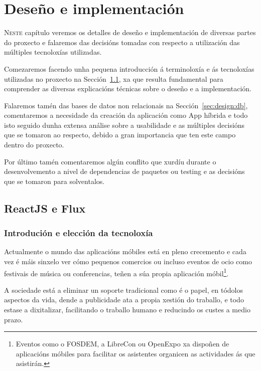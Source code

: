 \chapter{Deseño e implementación}
\minitoc


  \lettrine{N}{este} capítulo veremos os detalles de deseño e implementación 
de diversas partes do proxecto e falaremos das decisións tomadas con 
respecto a utilización das múltiples tecnoloxías utilizadas.

  Comezaremos facendo unha pequena introducción á terminoloxía e ás tecnoloxías 
utilizadas no proxecto na Sección~\ref{sec:design:react}, xa que resulta 
fundamental para comprender as diversas explicacións técnicas sobre o deseño e 
a implementación.

  Falaremos tamén das bases de datos non relacionais na 
Sección~\ref{sec:design:db}, comentaremos a necesidade da creación da 
aplicación como App híbrida e todo isto seguido dunha extensa análise sobre a 
usabilidade e as múltiples decisións que se tomaron ao respecto, debido a gran 
importancia que ten este campo dentro do proxecto.

  Por último tamén comentaremos algún conflito que xurdíu durante o 
desenvolvemento a nivel de dependencias de paquetes ou testing e as decisións 
que se tomaron para solventalos.

  \section{ReactJS e Flux}
  \label{sec:design:react}
    \subsection{Introdución e elección da tecnoloxía}
    Actualmente o mundo das aplicacións móbiles está en pleno crecemento e cada 
vez é máis sinxelo ver cómo pequenos comercios ou incluso eventos de ocio 
como festivais de música ou conferencias, teñen a súa propia aplicación 
móbil\footnote{Eventos como o FOSDEM, a LibreCon ou OpenExpo xa dispoñen de 
aplicacións móbiles para facilitar os asistentes organicen as actividades ás 
que asistirán.}.

    A sociedade está a eliminar un soporte tradicional como é o papel, en 
tódolos aspectos da vida, dende a publicidade ata a propia xestión do traballo, 
e todo estase a dixitalizar, facilitando o traballo humano e reducindo os custes 
a medio prazo.

